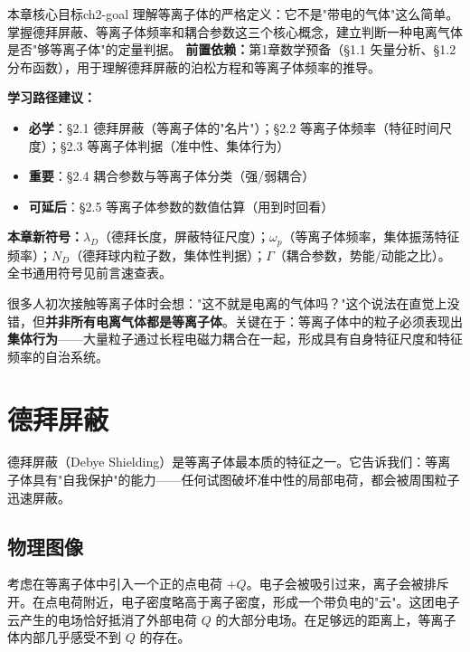 \documentclass[12pt,a4paper,openany,oneside]{book}
\newcommand{\difficulty}[1]{\marginnote{\hfill\textcolor{coverMid!80}{\rule[-0.1em]{2pt}{0.9em}}\,\textcolor{coverMid}{\footnotesize\textbf{[#1]}}}}
\begin{document}
\begin{insight}{本章核心目标}{ch2-goal}
理解等离子体的严格定义：它不是"带电的气体"这么简单。掌握德拜屏蔽、等离子体频率和耦合参数这三个核心概念，建立判断一种电离气体是否"够等离子体"的定量判据。
\tcblower
\textbf{前置依赖：}第1章数学预备（\S1.1 矢量分析、\S1.2 分布函数），用于理解德拜屏蔽的泊松方程和等离子体频率的推导。

\textbf{学习路径建议：}

\begin{itemize}[leftmargin=*]
\item[\textcolor{red}{$\blacksquare$}] \textbf{必学}：\S2.1 德拜屏蔽（等离子体的"名片"）；\S2.2 等离子体频率（特征时间尺度）；\S2.3 等离子体判据（准中性、集体行为）
\item[\textcolor{orange}{$\blacksquare$}] \textbf{重要}：\S2.4 耦合参数与等离子体分类（强/弱耦合）
\item[\textcolor{green}{$\blacksquare$}] \textbf{可延后}：\S2.5 等离子体参数的数值估算（用到时回看）
\end{itemize}

\textbf{本章新符号：}$\lambda_D$（德拜长度，屏蔽特征尺度）；$\omega_p$（等离子体频率，集体振荡特征频率）；$N_D$（德拜球内粒子数，集体性判据）；$\Gamma$（耦合参数，势能/动能之比）。全书通用符号见前言速查表。
\end{insight}

很多人初次接触等离子体时会想："这不就是电离的气体吗？"这个说法在直觉上没错，但\textbf{并非所有电离气体都是等离子体}。关键在于：等离子体中的粒子必须表现出\textbf{集体行为}——大量粒子通过长程电磁力耦合在一起，形成具有自身特征尺度和特征频率的自治系统。

\section{德拜屏蔽}\difficulty{基础}

德拜屏蔽（Debye Shielding）是等离子体最本质的特征之一。它告诉我们：等离子体具有"自我保护"的能力——任何试图破坏准中性的局部电荷，都会被周围粒子迅速屏蔽。

\subsection{物理图像}

考虑在等离子体中引入一个正的点电荷 $+Q$。电子会被吸引过来，离子会被排斥开。在点电荷附近，电子密度略高于离子密度，形成一个带负电的"云"。这团电子云产生的电场恰好抵消了外部电荷 $Q$ 的大部分电场。在足够远的距离上，等离子体内部几乎感受不到 $Q$ 的存在。
\end{document}
